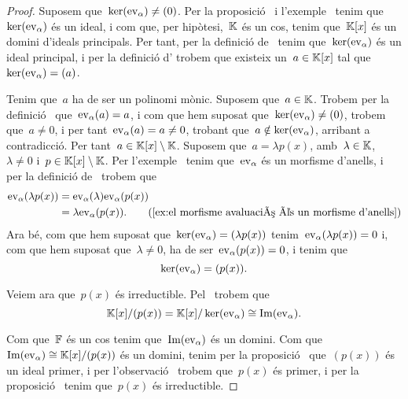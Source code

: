 \documentclass[../../main.tex]{subfiles}
\begin{document}
    \begin{proof} %
        Suposem que~\(\operatorname{ker}(\mathrm{ev}_{\alpha})\neq(0)\).
        Per la proposició~ i l'exemple~ tenim que~\(\operatorname{ker}(\mathrm{ev}_{\alpha})\) és un ideal, i com que, per hipòtesi,~\(\mathbb{K}\) és un cos, tenim que~\(\mathbb{K}[x]\) és un domini d'ideals principals.
        Per tant, per la definició de~ tenim que~\(\operatorname{ker}(\mathrm{ev}_{\alpha})\) és un ideal principal, i per la definició d' trobem que existeix un~\(a\in\mathbb{K}[x]\) tal que~\(\operatorname{ker}(\mathrm{ev}_{\alpha})=(a)\).

        Tenim que~\(a\) ha de ser un polinomi mònic.
        Suposem que~\(a\in\mathbb{K}\).
        Trobem per la definició~ que~\(\mathrm{ev}_{\alpha}(a)=a\), i com que hem suposat que~\(\operatorname{ker}(\mathrm{ev}_{\alpha})\neq(0)\), trobem que~\(a\neq0\), i per tant~\(\mathrm{ev}_{\alpha}(a)=a\neq0\), trobant que~\(a\notin\operatorname{ker}(\mathrm{ev}_{\alpha})\), arribant a contradicció.
        Per tant~\(a\in\mathbb{K}[x]\setminus\mathbb{K}\).
        Suposem que~\(a=\lambda p(x)\), amb~\(\lambda\in\mathbb{K}\),~\(\lambda\neq0\) i~\(p\in\mathbb{K}[x]\setminus\mathbb{K}\).
        Per l'exemple~ tenim que~\(\mathrm{ev}_{\alpha}\) és un morfisme d'anells, i per la definició de~ trobem que
        \begin{align*}
            \ev_{\alpha}(\lambda p(x))&=\ev_{\alpha}(\lambda)\ev_{\alpha}(p(x))\\
            &=\lambda\ev_{\alpha}(p(x)).
            \tag{\ref{ex:el morfisme avaluació és un morfisme d'anells}}
        \end{align*}
        Ara bé, com que hem suposat que~\(\operatorname{ker}(\mathrm{ev}_{\alpha})=(\lambda p(x))\) tenim~\(\mathrm{ev}_{\alpha}(\lambda p(x))=0\) i, com que hem suposat que~\(\lambda\neq0\), ha de ser~\(\mathrm{ev}_{\alpha}(p(x))=0\), i tenim que
        \[
            \operatorname{ker}(\mathrm{ev}_{\alpha})=(p(x)).
        \]

        Veiem ara que~\(p(x)\) és irreductible.
        Pel~ trobem que
        \[
            \mathbb{K}[x]/(p(x))=\mathbb{K}[x]/\operatorname{ker}(\mathrm{ev}_{\alpha})\cong\operatorname{Im}(\mathrm{ev}_{\alpha}).
        \]

        Com que~\(\mathbb{F}\) és un cos tenim que~\(\operatorname{Im}(\mathrm{ev}_{\alpha})\) és un domini.
        Com que~\(\operatorname{Im}(\mathrm{ev}_{\alpha})\cong\mathbb{K}[x]/(p(x))\) és un domini, tenim per la proposició~ que~\((p(x))\) és un ideal primer, i per l'observació~ trobem que~\(p(x)\) és primer, i per la proposició~ tenim que~\(p(x)\) és irreductible.
    \end{proof}
\end{document}
